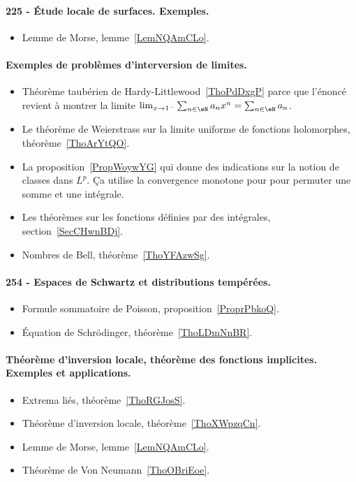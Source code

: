 \paragraph{225 - Étude locale de surfaces. Exemples.}
\begin{itemize}
    \item Lemme de Morse, lemme~\ref{LemNQAmCLo}.
\end{itemize}
\paragraph{Exemples de problèmes d’interversion de limites.}
\begin{itemize}
    \item Théorème taubérien de Hardy-Littlewood~\ref{ThoPdDxgP} parce que l'énoncé revient à montrer la limite \( \lim_{x\to 1^-} \sum_{n\in \eN}a_nx^n=\sum_{n\in \eN}a_n\).
    \item Le théorème de Weierstrass sur la limite uniforme de fonctions holomorphes, théorème~\ref{ThoArYtQO}.
    \item La proposition~\ref{PropWoywYG} qui donne des indications sur la notion de classes dans \( L^p\). Ça utilise la convergence monotone pour  pour permuter une somme et une intégrale.
    \item Les théorèmes sur les fonctions définies par des intégrales, section~\ref{SecCHwnBDj}.
    \item Nombres de Bell, théorème~\ref{ThoYFAzwSg}.
\end{itemize}
\paragraph{254 - Espaces de Schwartz et distributions tempérées.}
\begin{itemize}
    \item Formule sommatoire de Poisson, proposition~\ref{ProprPbkoQ}.
    \item Équation de Schrödinger, théorème~\ref{ThoLDmNnBR}.
\end{itemize}

\paragraph{Théorème d’inversion locale, théorème des fonctions implicites. Exemples et applications.}
\begin{itemize}
    \item Extrema liés, théorème~\ref{ThoRGJosS}.
    \item Théorème d'inversion locale, théorème~\ref{ThoXWpzqCn}.
    \item Lemme de Morse, lemme~\ref{LemNQAmCLo}.
    \item Théorème de Von Neumann~\ref{ThoOBriEoe}.
\end{itemize}
